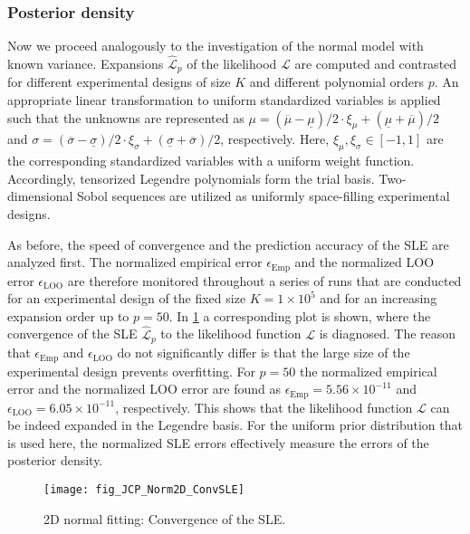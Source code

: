 \subsubsection{Posterior density}
Now we proceed analogously to the investigation of the normal model with known variance.
Expansions \(\hat{\mathcal{L}}_p\) of the likelihood \(\mathcal{L}\) are computed and contrasted for different experimental designs of size \(K\) and different polynomial orders \(p\).
An appropriate linear transformation to uniform standardized variables is applied such that the unknowns are represented as
\(\mu = (\overline{\mu} - \underline{\mu}) / 2 \cdot \xi_{\mu} + (\underline{\mu} + \overline{\mu}) / 2\) and 
\(\sigma = (\overline{\sigma} - \underline{\sigma}) / 2 \cdot \xi_{\sigma} + (\underline{\sigma} + \overline{\sigma}) / 2\), respectively.
Here, \(\xi_{\mu},\xi_{\sigma} \in [-1,1]\) are the corresponding standardized variables with a uniform weight function.
Accordingly, tensorized Legendre polynomials form the trial basis.
Two-dimensional Sobol sequences are utilized as uniformly space-filling experimental designs.
\par %
As before, the speed of convergence and the prediction accuracy of the SLE are analyzed first.
The normalized empirical error \(\epsilon_{\mathrm{Emp}}\) and the normalized LOO error \(\epsilon_{\mathrm{LOO}}\) are therefore monitored throughout a series of runs that are conducted
for an experimental design of the fixed size \(K = 1 \times 10^5\) and for an increasing expansion order up to \(p = 50\).
In \cref{fig:JCP:Normal:ConvSLE} a corresponding plot is shown, where the convergence of the SLE  \(\hat{\mathcal{L}}_p\) to the likelihood function \(\mathcal{L}\) is diagnosed.
The reason that \(\epsilon_{\mathrm{Emp}}\) and \(\epsilon_{\mathrm{LOO}}\) do not significantly differ is that the large size of the experimental design prevents overfitting.
For \(p = 50\) the normalized empirical error and the normalized LOO error are found as \(\epsilon_{\mathrm{Emp}} = 5.56 \times 10^{-11}\)
and \(\epsilon_{\mathrm{LOO}} = 6.05 \times 10^{-11}\), respectively.
This shows that the likelihood function \(\mathcal{L}\) can be indeed expanded in the Legendre basis.
For the uniform prior distribution that is used here, the normalized SLE errors effectively measure the errors of the posterior density.
\begin{figure}[htbp]
  \centering
  \texttt{[image: fig\_JCP\_Norm2D\_ConvSLE]}
  \caption[2D normal fitting: Convergence of the SLE]{2D normal fitting: Convergence of the SLE.}
  \label{fig:JCP:Normal:ConvSLE}
\end{figure}
